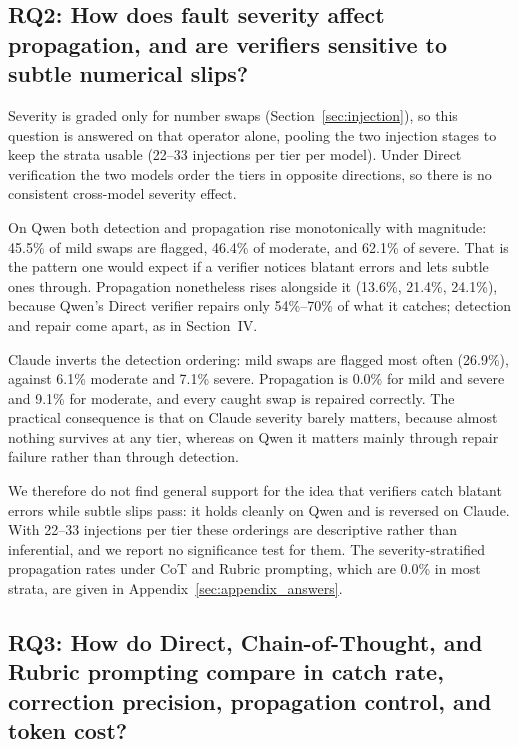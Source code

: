 \documentclass[11pt]{article}
\begin{document}
\subsection*{RQ2: How does fault severity affect propagation, and are verifiers sensitive to subtle numerical slips?}

Severity is graded only for number swaps (Section~\ref{sec:injection}), so this question is
answered on that operator alone, pooling the two injection stages to keep the strata usable
(22--33 injections per tier per model). Under Direct verification the two models order the
tiers in opposite directions, so there is no consistent cross-model severity effect.

On Qwen both detection and propagation rise monotonically with magnitude: 45.5\% of mild
swaps are flagged, 46.4\% of moderate, and 62.1\% of severe. That is the pattern one would
expect if a verifier notices blatant errors and lets subtle ones through. Propagation nonetheless rises alongside it
(13.6\%, 21.4\%, 24.1\%), because Qwen's Direct verifier repairs only 54\%--70\% of what it
catches; detection and repair come apart, as in Section~IV.

Claude inverts the detection ordering: mild swaps are flagged most often (26.9\%), against
6.1\% moderate and 7.1\% severe. Propagation is 0.0\% for mild and severe and 9.1\% for
moderate, and every caught swap is repaired correctly. The practical consequence is that on
Claude severity barely matters, because almost nothing survives at any tier, whereas on Qwen
it matters mainly through repair failure rather than through detection.

We therefore do not find general support for the idea that verifiers catch blatant errors
while subtle slips pass: it holds cleanly on Qwen and is reversed on Claude. With 22--33
injections per tier these orderings are descriptive rather than inferential, and we report
no significance test for them. The
severity-stratified propagation rates under CoT and Rubric prompting, which are 0.0\% in most
strata, are given in Appendix~\ref{sec:appendix_answers}.

\subsection*{RQ3: How do Direct, Chain-of-Thought, and Rubric prompting compare in catch rate, correction precision, propagation control, and token cost?}
\end{document}
